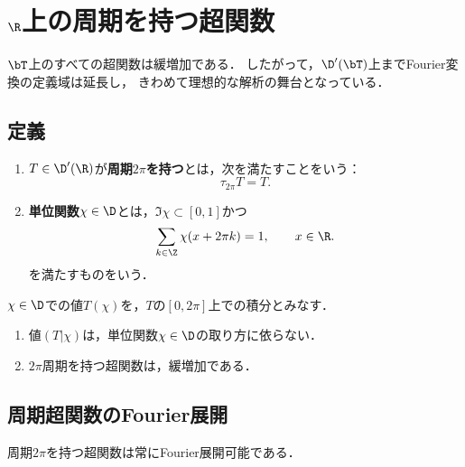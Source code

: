 \documentclass[uplatex,dvipdfmx]{jsreport}
\begin{document}
\section{$\R$上の周期を持つ超関数}

\begin{tcolorbox}[colframe=ForestGreen, colback=ForestGreen!10!white,breakable,colbacktitle=ForestGreen!40!white,coltitle=black,fonttitle=\bfseries\sffamily,
title=]
    $\bT$上のすべての超関数は緩増加である．
    したがって，$\D'(\bT)$上までFourier変換の定義域は延長し，
    きわめて理想的な解析の舞台となっている．
\end{tcolorbox}

\subsection{定義}

\begin{definition}\mbox{}
    \begin{enumerate}
        \item $T\in\D'(\R)$が\textbf{周期$2\pi$を持つ}とは，次を満たすことをいう：
        \[\tau_{2\pi}T=T.\]
        \item \textbf{単位関数}$\chi\in\D$とは，$\Im\chi\subset[0,1]$かつ
        \[\sum_{k\in\Z}\chi(x+2\pi k)=1,\qquad x\in\R.\]
        を満たすものをいう．
    \end{enumerate}
    $\chi\in\D$での値$T(\chi)$を，$T$の$[0,2\pi]$上での積分とみなす．
\end{definition}

\begin{lemma}\mbox{}
    \begin{enumerate}
        \item 値$(T|\chi)$は，単位関数$\chi\in\D$の取り方に依らない．
        \item $2\pi$周期を持つ超関数は，緩増加である．
    \end{enumerate}
\end{lemma}

\subsection{周期超関数のFourier展開}

\begin{tcolorbox}[colframe=ForestGreen, colback=ForestGreen!10!white,breakable,colbacktitle=ForestGreen!40!white,coltitle=black,fonttitle=\bfseries\sffamily,
title=]
    周期$2\pi$を持つ超関数は常にFourier展開可能である．
\end{tcolorbox}
\end{document}
